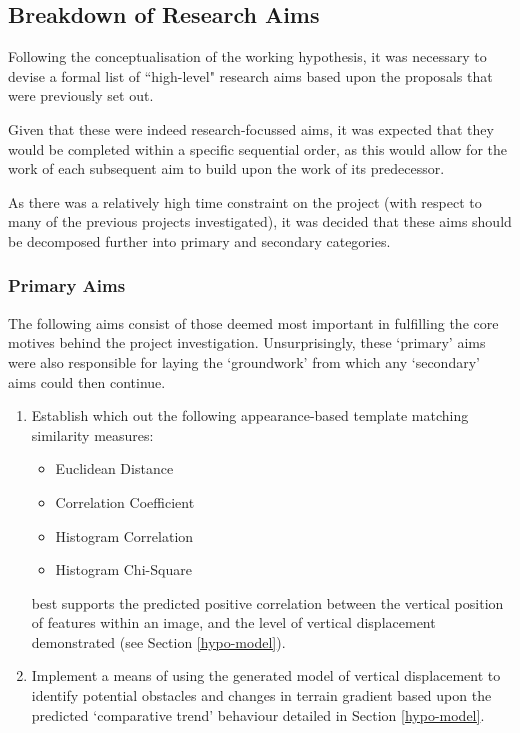 \subsection{Breakdown of Research Aims}

Following the conceptualisation of the working hypothesis, it was necessary to devise a formal list of ``high-level" research aims based upon the proposals that were previously set out. 

Given that these were indeed research-focussed aims, it was expected that they would be completed within a specific sequential order, as this would allow for the work of each subsequent aim to build upon the work of its predecessor.

As there was a relatively high time constraint on the project (with respect to many of the previous projects investigated), it was decided that these aims should be decomposed further into primary and secondary categories.

\subsubsection{Primary Aims}
\label{primary-aims}

The following aims consist of those deemed most important in fulfilling the core motives behind the project investigation. Unsurprisingly, these `primary' aims were also responsible for laying the `groundwork' from which any `secondary' aims could then continue.  

\begin{enumerate}
	\item Establish which out the following appearance-based template matching similarity measures:
		\begin{itemize}
			\item Euclidean Distance
			\item Correlation Coefficient
			\item Histogram Correlation
			\item Histogram Chi-Square
		\end{itemize}
	 best supports the predicted positive correlation between the vertical position of features within an image, and the level of vertical displacement demonstrated (see Section \ref{hypo-model}).
	 \item Implement a means of using the generated model of vertical displacement to identify potential obstacles and changes in terrain gradient based upon the predicted `comparative trend' behaviour detailed in Section \ref{hypo-model}.
\end{enumerate}

